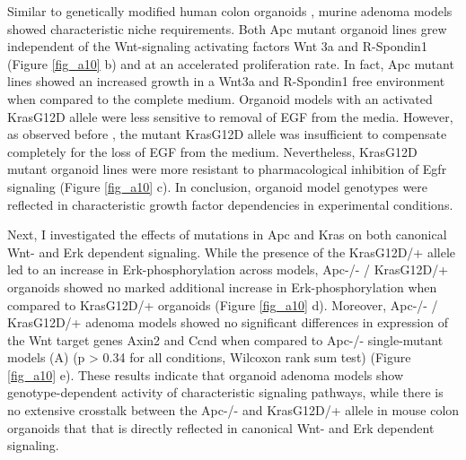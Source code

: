 \begin{flushleft}
Similar to genetically modified human colon organoids \cite{Drost2015-ph, Matano2015-zw}, murine adenoma models showed characteristic niche requirements. Both Apc mutant organoid lines grew independent of the Wnt-signaling activating factors Wnt 3a and R-Spondin1 (Figure \ref{fig_a10} b) and at an accelerated proliferation rate. In fact, Apc mutant lines showed an increased growth in a Wnt3a and R-Spondin1 free environment when compared to the complete medium. Organoid models with an activated KrasG12D allele were less sensitive to removal of EGF from the media. However, as observed before \cite{Drost2015-ph}, the mutant KrasG12D allele was insufficient to compensate completely for the loss of EGF from the medium. Nevertheless, KrasG12D mutant organoid lines were more resistant to pharmacological inhibition of Egfr signaling (Figure \ref{fig_a10} c). In conclusion, organoid model genotypes were reflected in characteristic growth factor dependencies in experimental conditions. 

\bigbreak
Next, I investigated the effects of mutations in Apc and Kras on both canonical Wnt- and Erk dependent signaling. While the presence of the KrasG12D/+ allele led to an increase in Erk-phosphorylation across models, Apc-/- / KrasG12D/+ organoids showed no marked additional increase in Erk-phosphorylation when compared to KrasG12D/+ organoids (Figure \ref{fig_a10} d). Moreover, Apc-/- / KrasG12D/+ adenoma models showed no significant differences in expression of the Wnt target genes Axin2 and Ccnd when compared to Apc-/- single-mutant models (A) (p > 0.34 for all conditions, Wilcoxon rank sum test) (Figure \ref{fig_a10} e). These results indicate that organoid adenoma models show genotype-dependent activity of characteristic signaling pathways, while there is no extensive crosstalk between the Apc-/-  and KrasG12D/+ allele in mouse colon organoids that that is directly reflected in canonical Wnt- and Erk dependent signaling.  

\bigbreak

\end{flushleft}
